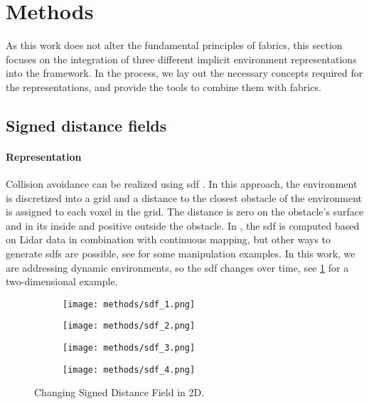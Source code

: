 \section{Methods}
\label{sec:ral24_methods}

As this work does not alter the fundamental principles of
\ac{fabrics}, this section focuses on the integration of
three different implicit environment representations into
the framework. In the process, we lay out the necessary
concepts required for the representations, and provide the
tools to combine them with \ac{fabrics}.
%
\subsection{Signed distance fields}
\label{sub:signed_distance_fields}

\paragraph{Representation}
Collision avoidance can be realized using \ac{sdf}
\cite{Oleynikova2017voxblox}.
In this approach, the environment is discretized into a grid and a distance to
the closest obstacle of the environment is assigned to each voxel in the grid.
The distance is zero on the
obstacle's surface and in its inside and positive outside the obstacle.
In \cite{Oleynikova2017voxblox}, the \ac{sdf} is computed
based on Lidar data in combination with continuous mapping,
but other ways to generate \acp{sdf} are possible, see
\cite{Liu2022regularized,Koptev2023neural} for some
manipulation examples.
In this work, we are addressing dynamic environments, so the \ac{sdf} changes
over time, see \cref{fig:sdf} for a two-dimensional example.
%
\begin{figure}[ht]
  \centering
  \begin{subfigure}{0.25\linewidth}
    \centering
    \texttt{[image: methods/sdf\_1.png]}
  \end{subfigure}%
  \begin{subfigure}{0.25\linewidth}
    \centering
    \texttt{[image: methods/sdf\_2.png]}
  \end{subfigure}%
  \begin{subfigure}{0.25\linewidth}
    \centering
    \texttt{[image: methods/sdf\_3.png]}
  \end{subfigure}%
  \begin{subfigure}{0.25\linewidth}
    \centering
    \texttt{[image: methods/sdf\_4.png]}
  \end{subfigure}
  \caption{Changing Signed Distance Field in 2D.
  }%
  \label{fig:sdf}
\end{figure}

